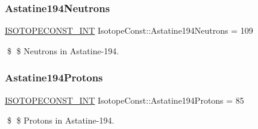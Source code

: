 \subsubsection{\texorpdfstring{Astatine194\+Neutrons}{Astatine194Neutrons}}
{\footnotesize\ttfamily \mbox{\hyperlink{group___isotope_const-_macros_ga5f18360b3e99483a35c32d789e62621c}{I\+S\+O\+T\+O\+P\+E\+C\+O\+N\+S\+T\+\_\+\+I\+NT}} Isotope\+Const\+::\+Astatine194\+Neutrons = 109}

\$ \$ Neutrons in Astatine-\/194. \mbox{\label{group___isotope_const-_astatine-_at194_ga35e9fc7d7b391f08ea0c94e5321b7435}} 
\subsubsection{\texorpdfstring{Astatine194\+Protons}{Astatine194Protons}}
{\footnotesize\ttfamily \mbox{\hyperlink{group___isotope_const-_macros_ga5f18360b3e99483a35c32d789e62621c}{I\+S\+O\+T\+O\+P\+E\+C\+O\+N\+S\+T\+\_\+\+I\+NT}} Isotope\+Const\+::\+Astatine194\+Protons = 85}

\$ \$ Protons in Astatine-\/194. 